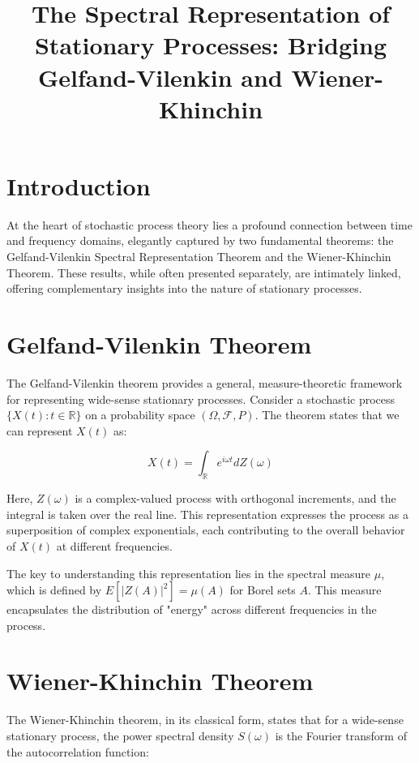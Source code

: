 \documentclass{article}
\begin{document}
\title{The Spectral Representation of Stationary Processes: Bridging Gelfand-Vilenkin and Wiener-Khinchin}
\author{}
\date{}

\maketitle

\section{Introduction}

At the heart of stochastic process theory lies a profound connection between time and frequency domains, elegantly captured by two fundamental theorems: the Gelfand-Vilenkin Spectral Representation Theorem and the Wiener-Khinchin Theorem. These results, while often presented separately, are intimately linked, offering complementary insights into the nature of stationary processes.

\section{Gelfand-Vilenkin Theorem}

The Gelfand-Vilenkin theorem provides a general, measure-theoretic framework for representing wide-sense stationary processes. Consider a stochastic process $\{X(t) : t \in \mathbb{R}\}$ on a probability space $(\Omega, \mathcal{F}, P)$. The theorem states that we can represent $X(t)$ as:

\[X(t) = \int_{\mathbb{R}} e^{i\omega t} dZ(\omega)\]

Here, $Z(\omega)$ is a complex-valued process with orthogonal increments, and the integral is taken over the real line. This representation expresses the process as a superposition of complex exponentials, each contributing to the overall behavior of $X(t)$ at different frequencies.

The key to understanding this representation lies in the spectral measure $\mu$, which is defined by $E[|Z(A)|^2] = \mu(A)$ for Borel sets $A$. This measure encapsulates the distribution of "energy" across different frequencies in the process.

\section{Wiener-Khinchin Theorem}

The Wiener-Khinchin theorem, in its classical form, states that for a wide-sense stationary process, the power spectral density $S(\omega)$ is the Fourier transform of the autocorrelation function:
\end{document}
